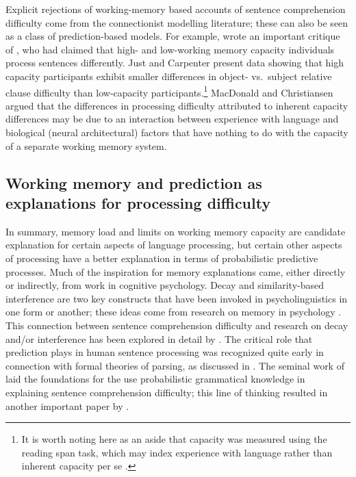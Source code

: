 \documentclass{cambridge7A}\usepackage[]{graphicx}\usepackage[]{color}
\begin{document}
Explicit rejections of working-memory based accounts of sentence comprehension difficulty come from the connectionist modelling literature; these can also be seen as a class of prediction-based models.
For example, \cite{MacDonaldChristiansen2002} wrote an important critique of \cite{JustCarpenter1992}, who had claimed that high- and low-working memory capacity individuals process sentences differently. Just and Carpenter present data showing that high capacity  participants exhibit smaller differences in object- vs.\ subject relative clause difficulty than 
low-capacity participants.\footnote{It is worth noting here as an aside that capacity was measured using the \cite{DanemanCarpenter1980} reading span task, which may index experience with language rather than inherent capacity per se \citep{wellsetal}.} MacDonald and Christiansen argued that the differences in processing difficulty attributed to inherent  
capacity differences may be due to an interaction between experience with language and biological (neural architectural) factors that have nothing to do with the capacity of a separate working memory system.

\subsection{Working memory and prediction as explanations for processing difficulty}

 
In summary,  memory load and limits on working memory capacity are candidate explanation for certain aspects of language processing, but certain other aspects of processing have a better explanation in terms of probabilistic predictive processes.  Much of the inspiration for memory
explanations came, either directly or indirectly, from work in cognitive psychology. Decay and 
similarity-based interference are two key     
constructs that have been invoked in psycholinguistics in one form or another;  these ideas come from research on memory in psychology \citep{brown,petersonpeterson,keppelunderwood,waughnorman}. This 
connection between sentence comprehension difficulty and research on
decay and/or interference has been explored in detail by
\cite{lewis:magical,lewis:phd,Gibson2000,JustCarpenter1992}. The critical role that prediction plays in human sentence processing was recognized quite early in connection with formal  theories of parsing, as discussed in \cite{philip92leftcorner}. The seminal work of \cite{Jurafsky1996} laid the foundations for the use probabilistic grammatical knowledge in explaining sentence comprehension difficulty; this line of thinking  resulted in another important paper by \cite{Levy2008}. 
\end{document}
